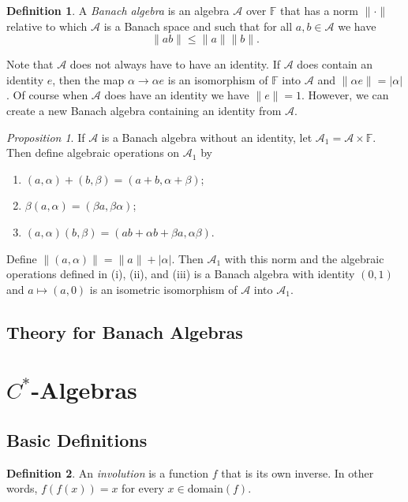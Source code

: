 \documentclass[leqno]{article}
\theoremstyle{definition}
\newtheorem{definition}{Definition}[section]
\theoremstyle{remark}
\theoremstyle{theorem}
\newtheorem{proposition}{Proposition}
\newcommand{\F}{\mathbb{F}}
\newcommand{\A}{\mathcal{A}}
\begin{document}
\begin{definition}
A \emph{Banach algebra} is an algebra $\A$ over $\F$ that has a norm $\|\cdot \|$ relative to which $\A$ is a Banach space and such that for all $a,b\in \A$ we have
\[
\|ab\|\leq \|a\|\|b\|.
\]
\end{definition}

Note that $\A$ does not always have to have an identity.  If $\A$ does contain an identity $e$, then the map $\alpha \to \alpha e$ is an isomorphism of $\F$ into $\A$ and $\|\alpha e \|=|\alpha|$. Of course when $\A$ does have an identity we have $\|e\|=1$. However, we can create a new Banach algebra containing an identity from $\A$.

\begin{proposition}
If $\A$ is a Banach algebra without an identity, let $\A_1=\A\times \F$. Then define algebraic operations on $\A_1$ by
\begin{enumerate}[\textnormal{(i)}]
\item $(a,\alpha)+(b,\beta)=(a+b,\alpha+\beta)$;
\item $\beta(a,\alpha)=(\beta a,\beta \alpha)$;
\item $(a,\alpha)(b,\beta)=(ab+\alpha b+\beta a, \alpha \beta)$.
\end{enumerate}
Define $\|(a,\alpha)\|=\|a\|+|\alpha|$. Then $\A_1$ with this norm and the algebraic operations defined in (i), (ii), and (iii) is a Banach algebra with identity $(0,1)$ and $a\mapsto (a,0)$ is an isometric isomorphism of $\A$ into $\A_1$.
\end{proposition}

\subsection{Theory for Banach Algebras}





\section{$C^*$-Algebras}

\subsection{Basic Definitions}
\begin{definition}
An \emph{involution} is a function $f$ that is its own inverse.  In other words, $f(f(x))=x$ for every $x\in \mathrm{domain}(f)$.
\end{definition}
\end{document}
